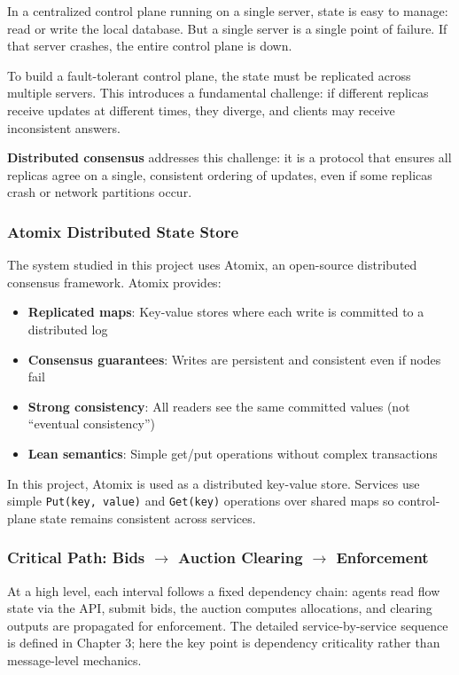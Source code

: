 In a centralized control plane running on a single server, state is easy to manage: read or write the local database. But a single server is a single point of failure. If that server crashes, the entire control plane is down.

To build a fault-tolerant control plane, the state must be replicated across multiple servers. This introduces a fundamental challenge: if different replicas receive updates at different times, they diverge, and clients may receive inconsistent answers.

\textbf{Distributed consensus} addresses this challenge: it is a protocol that ensures all replicas agree on a single, consistent ordering of updates, even if some replicas crash or network partitions occur.

\subsubsection{Atomix Distributed State Store}

The system studied in this project uses Atomix, an open-source distributed consensus framework. Atomix provides:

\begin{itemize}
    \item \textbf{Replicated maps}: Key-value stores where each write is committed to a distributed log
    \item \textbf{Consensus guarantees}: Writes are persistent and consistent even if nodes fail
    \item \textbf{Strong consistency}: All readers see the same committed values (not ``eventual consistency'')
    \item \textbf{Lean semantics}: Simple get/put operations without complex transactions
\end{itemize}

In this project, Atomix is used as a distributed key-value store. Services use simple \texttt{Put(key, value)} and \texttt{Get(key)} operations over shared maps so control-plane state remains consistent across services.

\subsubsection{Critical Path: Bids $\rightarrow$ Auction Clearing $\rightarrow$ Enforcement}

At a high level, each interval follows a fixed dependency chain: agents read flow state via the API, submit bids, the auction computes allocations, and clearing outputs are propagated for enforcement. The detailed service-by-service sequence is defined in Chapter 3; here the key point is dependency criticality rather than message-level mechanics.


